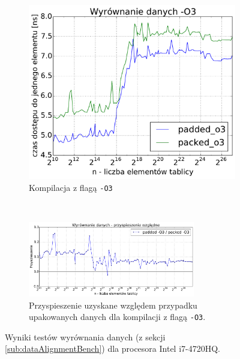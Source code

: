 \begin{figure}[!h]
\begin{subfigure}[c]{0.45\textwidth}
        \centering
        \includegraphics[width=\textwidth]{images/benchs/data_alignment_O3}
        \caption{Kompilacja z flagą \texttt{-O3}}
    \end{subfigure}
    \\
    \vspace{0.55cm}
    \begin{subfigure}[c]{1.0\textwidth}
        \centering
        \includegraphics[width=0.80\textwidth]{images/benchs/data_alignment_normalized}
        \caption{Przyspieszenie uzyskane względem przypadku upakowanych danych dla kompilacji z flagą \texttt{-O3}.}
        \label{fig:dataAlignmentRelative} 
    \end{subfigure}
    \caption{Wyniki testów wyrównania danych (z sekcji \ref{sub:dataAlignmentBench}) dla procesora Intel i7-4720HQ.}
    \label{fig:dataAlignmentBench}
\end{figure}


